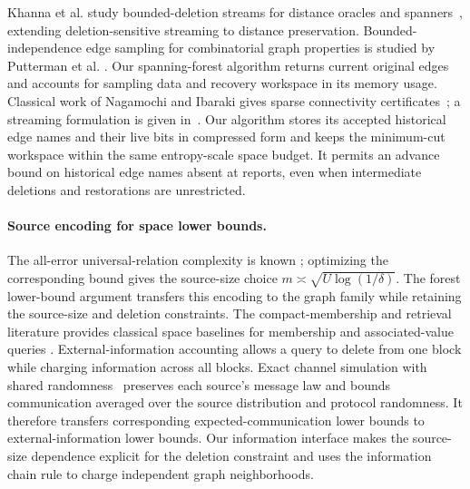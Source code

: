 \documentclass[11pt,letterpaper]{article}
\numberwithin{equation}{section}
\begin{document}
Khanna et al. study bounded-deletion streams for distance oracles and spanners~\cite{KhannaKonradPutterman2026}, extending deletion-sensitive streaming to distance preservation.
Bounded-independence edge sampling for combinatorial graph properties is studied by Putterman et al. \cite{PuttermanVadhanZaripov2026}.
Our spanning-forest algorithm returns current original edges and accounts for sampling data and recovery workspace in its memory usage.
Classical work of Nagamochi and Ibaraki gives sparse connectivity certificates~\cite{NagamochiIbaraki1992}; a streaming formulation is given in~\cite[Lemma~3.7]{JinKapralovMahabadiVakilian2024}.
Our algorithm stores its accepted historical edge names and their live bits in compressed form and keeps the minimum-cut workspace within the same entropy-scale space budget.
It permits an advance bound on historical edge names absent at reports, even when intermediate deletions and restorations are unrestricted.

\paragraph{Source encoding for space lower bounds.}
The all-error universal-relation complexity is known \cite{KNPWWY2017,NelsonYu2019}; optimizing the corresponding bound gives the source-size choice $m\asymp\sqrt{U\log(1/\delta)}$.
The forest lower-bound argument transfers this encoding to the graph family while retaining the source-size and deletion constraints.
The compact-membership and retrieval literature provides classical space baselines for membership and associated-value queries \cite{Carter78,DP08}.
External-information accounting allows a query to delete from one block while charging information across all blocks.
Exact channel simulation with shared randomness~\cite[Result~1]{HJMR2010} preserves each source's message law and bounds communication averaged over the source distribution and protocol randomness.
It therefore transfers corresponding expected-communication lower bounds to external-information lower bounds.
Our information interface makes the source-size dependence explicit for the deletion constraint and uses the information chain rule to charge independent graph neighborhoods.
\end{document}

